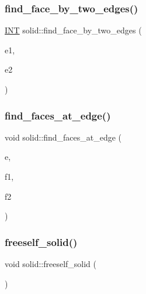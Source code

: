 \mbox{\label{classsolid_a83a357e708d7da429afe714dc40a5930}} 
\subsubsection{\texorpdfstring{find\+\_\+face\+\_\+by\+\_\+two\+\_\+edges()}{find\_face\_by\_two\_edges()}}
{\footnotesize\ttfamily \mbox{\hyperlink{galois_8h_a09fddde158a3a20bd2dcadb609de11dc}{I\+NT}} solid\+::find\+\_\+face\+\_\+by\+\_\+two\+\_\+edges (\begin{DoxyParamCaption}\item[{\mbox{\hyperlink{galois_8h_a09fddde158a3a20bd2dcadb609de11dc}{I\+NT}}}]{e1,  }\item[{\mbox{\hyperlink{galois_8h_a09fddde158a3a20bd2dcadb609de11dc}{I\+NT}}}]{e2 }\end{DoxyParamCaption})}

\mbox{\label{classsolid_ae6339a607e15cbfaa028063296ed9767}} 
\subsubsection{\texorpdfstring{find\+\_\+faces\+\_\+at\+\_\+edge()}{find\_faces\_at\_edge()}}
{\footnotesize\ttfamily void solid\+::find\+\_\+faces\+\_\+at\+\_\+edge (\begin{DoxyParamCaption}\item[{\mbox{\hyperlink{galois_8h_a09fddde158a3a20bd2dcadb609de11dc}{I\+NT}}}]{e,  }\item[{\mbox{\hyperlink{galois_8h_a09fddde158a3a20bd2dcadb609de11dc}{I\+NT}} \&}]{f1,  }\item[{\mbox{\hyperlink{galois_8h_a09fddde158a3a20bd2dcadb609de11dc}{I\+NT}} \&}]{f2 }\end{DoxyParamCaption})}

\mbox{\label{classsolid_a84c2f0abd7b24b1cf2ccefa9c99567fe}} 
\subsubsection{\texorpdfstring{freeself\+\_\+solid()}{freeself\_solid()}}
{\footnotesize\ttfamily void solid\+::freeself\+\_\+solid (\begin{DoxyParamCaption}{ }\end{DoxyParamCaption})}

